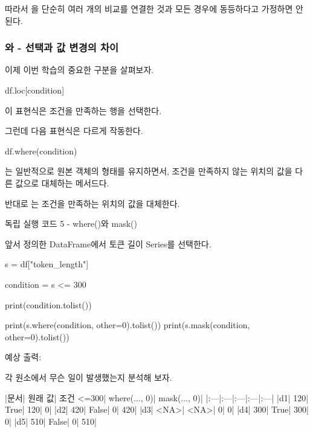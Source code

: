 따라서 을 단순히 여러 개의 \zsh{==} 비교를 연결한 것과 모든 경우에 동등하다고 가정하면 안 된다.

\subsubsection{와  - 선택과 값 변경의 차이}

이제 이번 학습의 중요한 구분을 살펴보자.

\begin{dhkcode}
df.loc[condition]
\end{dhkcode}

이 표현식은 조건을 만족하는 행을 선택한다.

그런데 다음 표현식은 다르게 작동한다.

\begin{dhkcode}
df.where(condition)
\end{dhkcode}

는 일반적으로 원본 객체의 형태를 유지하면서, 조건을 만족하지 않는 위치의 값을 다른 값으로 대체하는 메서드다.

반대로 는 조건을 만족하는 위치의 값을 대체한다.

\begin{dhknote}
\begin{dhksmry}[centered]
독립 실행 코드 5 - where()와 mask()
\end{dhksmry}
\end{dhknote}

앞서 정의한 DataFrame에서 토큰 길이 Series를 선택한다.

\begin{dhkcode}
s = df["token_length"]

condition = s <= 300

print(condition.tolist())

print(s.where(condition, other=0).tolist())
print(s.mask(condition, other=0).tolist())
\end{dhkcode}

예상 출력:

\begin{dhkzsh}
\end{dhkzsh}

각 원소에서 무슨 일이 발생했는지 분석해 보자.

\begin{dhktable}
|문서|	원래 값|	조건 <=300|	where(..., 0)|	mask(..., 0)|
|:---|:---|:---|:---|:---|
|d1|	120|	True|	120|	0|
|d2|	420|	False|	0|	420|
|d3|	<NA>|	<NA>|	0|	0|
|d4|	300|	True|	300|	0|
|d5|	510|	False|	0|	510|
\end{dhktable}

